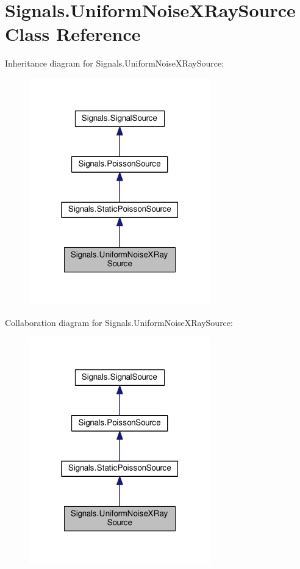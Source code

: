 \hypertarget{classSignals_1_1UniformNoiseXRaySource}{}\section{Signals.\+Uniform\+Noise\+X\+Ray\+Source Class Reference}
\label{classSignals_1_1UniformNoiseXRaySource}


Inheritance diagram for Signals.\+Uniform\+Noise\+X\+Ray\+Source\+:\nopagebreak
\begin{figure}[H]
\begin{center}
\leavevmode
\includegraphics[width=223pt]{classSignals_1_1UniformNoiseXRaySource__inherit__graph}
\end{center}
\end{figure}


Collaboration diagram for Signals.\+Uniform\+Noise\+X\+Ray\+Source\+:\nopagebreak
\begin{figure}[H]
\begin{center}
\leavevmode
\includegraphics[width=223pt]{classSignals_1_1UniformNoiseXRaySource__coll__graph}
\end{center}
\end{figure}
